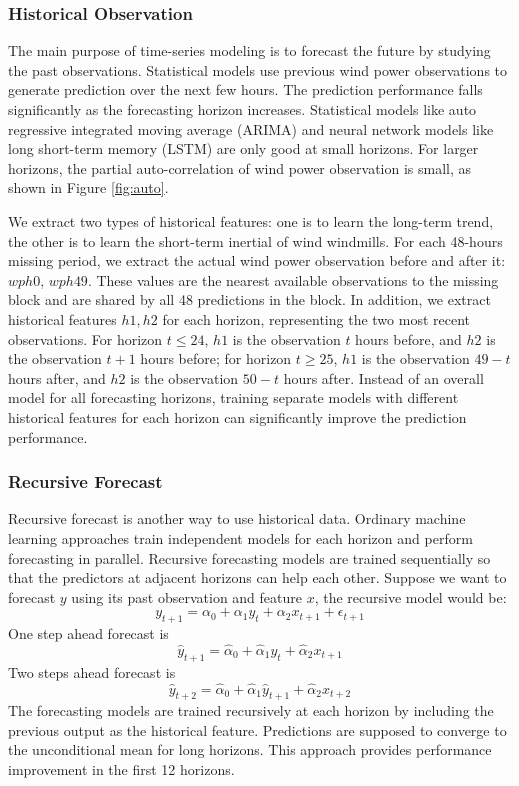 \documentclass[conference]{IEEEtran}
\begin{document}
\subsubsection{Historical Observation}
The main purpose of time-series modeling is to forecast the future by studying the past observations. Statistical models use previous wind power observations to generate prediction over the next few hours. The prediction performance falls significantly as the forecasting horizon increases. Statistical models like auto regressive integrated moving average (ARIMA) and neural network models like long short-term memory (LSTM) are only good at small horizons. For larger horizons, the partial auto-correlation of wind power observation is small, as shown in Figure \ref{fig:auto}.  

We extract two types of historical features: one is to learn the long-term trend, the other is to learn the short-term inertial of wind windmills. For each 48-hours missing period, we extract the actual wind power observation before and after it: $wph0$, $wph49$. These values are the nearest available observations to the missing block and are shared by all 48 predictions in the block. In addition, we extract historical features $h1, h2$ for each horizon, representing the two most recent observations. For horizon $t \leq 24$, $h1$ is the observation $t$ hours before, and $h2$ is the observation $t+1$ hours before; for horizon $t \geq 25$,  $h1$ is the observation $49-t$ hours after, and $h2$ is the observation $50-t$ hours after. Instead of an overall model for all forecasting horizons, training separate models with different historical features for each horizon can significantly improve the prediction performance. 

\subsubsection{Recursive Forecast}
Recursive forecast is another way to use historical data. Ordinary machine learning approaches train independent models for each horizon and perform forecasting in parallel. Recursive forecasting models are trained sequentially so that the predictors at adjacent horizons can help each other. Suppose we want to forecast $y$ using its past observation and feature $x$, the recursive model would be:
\begin{equation}
    y_{t+1} = \alpha_0 + \alpha_1 y_t + \alpha_2 x_{t+1} + \epsilon_{t+1}
\end{equation}
One step ahead forecast is
\begin{equation}
    \hat{y}_{t+1} = \hat{\alpha}_0 + \hat{\alpha}_1 y_t + \hat{\alpha}_2 x_{t+1}
\end{equation}
Two steps ahead forecast is
\begin{equation}
    \hat{y}_{t+2} = \hat{\alpha}_0 + \hat{\alpha}_1 \hat{y}_{t+1} + \hat{\alpha}_2 x_{t+2}
\end{equation}
The forecasting models are trained recursively at each horizon by including the previous output as the historical feature. Predictions are supposed to converge to the unconditional mean for long horizons. This approach provides performance improvement in the first 12 horizons. 
\end{document}
